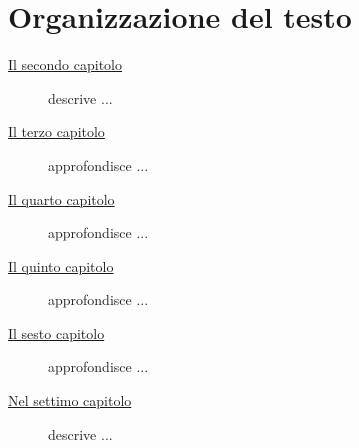 \section{Organizzazione del testo}

\begin{description}
    \item[{\hyperref[cap:processi-metodologie]{Il secondo capitolo}}] descrive ...
    
    \item[{\hyperref[cap:descrizione-stage]{Il terzo capitolo}}] approfondisce ...
    
    \item[{\hyperref[cap:analisi-requisiti]{Il quarto capitolo}}] approfondisce ...
    
    \item[{\hyperref[cap:progettazione-codifica]{Il quinto capitolo}}] approfondisce ...
    
    \item[{\hyperref[cap:verifica-validazione]{Il sesto capitolo}}] approfondisce ...
    
    \item[{\hyperref[cap:conclusioni]{Nel settimo capitolo}}] descrive ...
\end{description}
